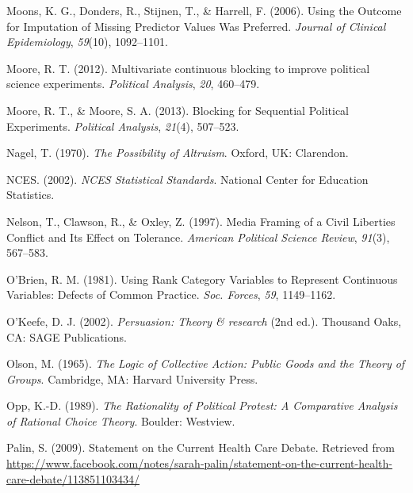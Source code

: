 \documentclass[12pt,econ]{sources/authesis}
\begin{document}
\leavevmode\hypertarget{ref-moons_2006_using}{}%
Moons, K. G., Donders, R., Stijnen, T., \& Harrell, F. (2006). Using the Outcome for Imputation of Missing Predictor Values Was Preferred. \emph{Journal of Clinical Epidemiology}, \emph{59}(10), 1092--1101.

\leavevmode\hypertarget{ref-moore_2012_multivariate}{}%
Moore, R. T. (2012). Multivariate continuous blocking to improve political science experiments. \emph{Political Analysis}, \emph{20}, 460--479.

\leavevmode\hypertarget{ref-moore_blocking_2013}{}%
Moore, R. T., \& Moore, S. A. (2013). Blocking for Sequential Political Experiments. \emph{Political Analysis}, \emph{21}(4), 507--523.

\leavevmode\hypertarget{ref-nagel_1970_possibility}{}%
Nagel, T. (1970). \emph{The Possibility of Altruism}. Oxford, UK: Clarendon.

\leavevmode\hypertarget{ref-education-statistics_2002_nces}{}%
NCES. (2002). \emph{NCES Statistical Standards}. National Center for Education Statistics.

\leavevmode\hypertarget{ref-nelson_media_1997}{}%
Nelson, T., Clawson, R., \& Oxley, Z. (1997). Media Framing of a Civil Liberties Conflict and Its Effect on Tolerance. \emph{American Political Science Review}, \emph{91}(3), 567--583.

\leavevmode\hypertarget{ref-obrien_1981_using}{}%
O'Brien, R. M. (1981). Using Rank Category Variables to Represent Continuous Variables: Defects of Common Practice. \emph{Soc. Forces}, \emph{59}, 1149--1162.

\leavevmode\hypertarget{ref-okeefe_2002_persuasion}{}%
O'Keefe, D. J. (2002). \emph{Persuasion: Theory \& research} (2nd ed.). Thousand Oaks, CA: SAGE Publications.

\leavevmode\hypertarget{ref-olson_logic_1965}{}%
Olson, M. (1965). \emph{The Logic of Collective Action: Public Goods and the Theory of Groups}. Cambridge, MA: Harvard University Press.

\leavevmode\hypertarget{ref-opp_rationality_1989}{}%
Opp, K.-D. (1989). \emph{The Rationality of Political Protest: A Comparative Analysis of Rational Choice Theory}. Boulder: Westview.

\leavevmode\hypertarget{ref-palin_statement_2009}{}%
Palin, S. (2009). Statement on the Current Health Care Debate. Retrieved from \url{https://www.facebook.com/notes/sarah-palin/statement-on-the-current-health-care-debate/113851103434/}
\end{document}
